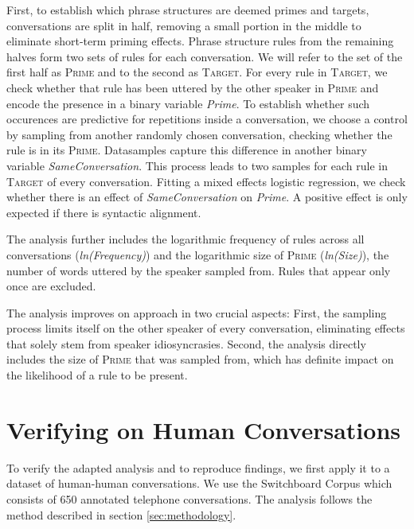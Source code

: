\documentclass[11pt]{article}
\begin{document}
First, to establish which phrase structures are deemed primes and targets, conversations are split in half, removing a small portion in the middle to eliminate short-term priming effects. Phrase structure rules from the remaining halves form two sets of rules for each conversation. We will refer to the set of the first half as \textsc{Prime} and to the second as \textsc{Target}. For every rule in \textsc{Target}, we check whether that rule has been uttered by the other speaker in \textsc{Prime} and encode the presence in a binary variable \textit{Prime}.
To establish whether such occurences are predictive for repetitions inside a conversation, we choose a control by sampling from another randomly chosen conversation, checking whether the rule is in its \textsc{Prime}. Datasamples capture this difference in another binary variable \textit{SameConversation}. This process leads to two samples for each rule in \textsc{Target} of every conversation. Fitting a mixed effects logistic regression, we check whether there is an effect of \textit{SameConversation} on \textit{Prime}. A positive effect is only expected if there is syntactic alignment.

The analysis further includes the logarithmic frequency of rules across all conversations (\textit{ln(Frequency)}) and the logarithmic size of \textsc{Prime} (\textit{ln(Size)}), the number of words uttered by the speaker sampled from. Rules that appear only once are excluded. 

The analysis improves on  approach in two crucial aspects: First, the sampling process limits itself on the other speaker of every conversation, eliminating effects that solely stem from speaker idiosyncrasies. Second, the analysis directly includes the size of \textsc{Prime} that was sampled from, which has definite impact on the likelihood of a rule to be present.


\section{Verifying on Human Conversations}
To verify the adapted analysis and to reproduce  findings, we first apply it to a dataset of human-human conversations. We use the Switchboard Corpus \cite{marcus1994penn} which consists of 650 annotated telephone conversations. The analysis follows the method described in section \ref{sec:methodology}.
\end{document}
